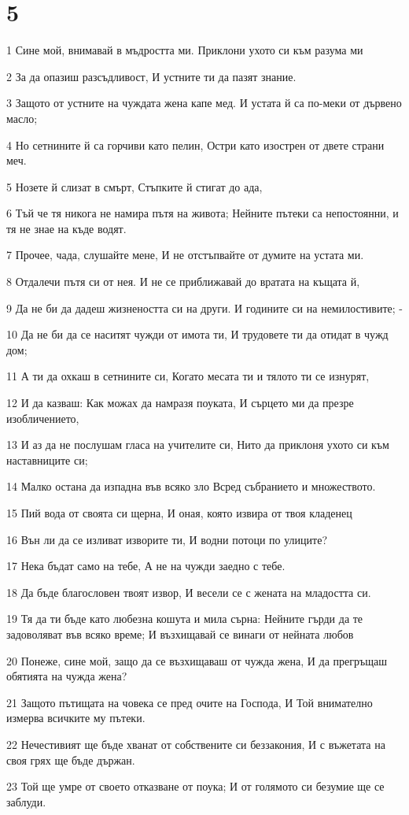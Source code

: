 \chapter{5}

\par 1 Сине мой, внимавай в мъдростта ми. Приклони ухото си към разума ми
\par 2 За да опазиш разсъдливост, И устните ти да пазят знание.
\par 3 Защото от устните на чуждата жена капе мед. И устата й са по-меки от дървено масло;
\par 4 Но сетнините й са горчиви като пелин, Остри като изострен от двете страни меч.
\par 5 Нозете й слизат в смърт, Стъпките й стигат до ада,
\par 6 Тъй че тя никога не намира пътя на живота; Нейните пътеки са непостоянни, и тя не знае на къде водят.
\par 7 Прочее, чада, слушайте мене, И не отстъпвайте от думите на устата ми.
\par 8 Отдалечи пътя си от нея. И не се приближавай до вратата на къщата й,
\par 9 Да не би да дадеш жизнеността си на други. И годините си на немилостивите; -
\par 10 Да не би да се наситят чужди от имота ти, И трудовете ти да отидат в чужд дом;
\par 11 А ти да охкаш в сетнините си, Когато месата ти и тялото ти се изнурят,
\par 12 И да казваш: Как можах да намразя поуката, И сърцето ми да презре изобличението,
\par 13 И аз да не послушам гласа на учителите си, Нито да приклоня ухото си към наставниците си;
\par 14 Малко остана да изпадна във всяко зло Всред събранието и множеството.
\par 15 Пий вода от своята си щерна, И оная, която извира от твоя кладенец
\par 16 Вън ли да се изливат изворите ти, И водни потоци по улиците?
\par 17 Нека бъдат само на тебе, А не на чужди заедно с тебе.
\par 18 Да бъде благословен твоят извор, И весели се с жената на младостта си.
\par 19 Тя да ти бъде като любезна кошута и мила сърна: Нейните гърди да те задоволяват във всяко време; И възхищавай се винаги от нейната любов
\par 20 Понеже, сине мой, защо да се възхищаваш от чужда жена, И да прегръщаш обятията на чужда жена?
\par 21 Защото пътищата на човека се пред очите на Господа, И Той внимателно измерва всичките му пътеки.
\par 22 Нечестивият ще бъде хванат от собствените си беззакония, И с въжетата на своя грях ще бъде държан.
\par 23 Той ще умре от своето отказване от поука; И от голямото си безумие ще се заблуди.

